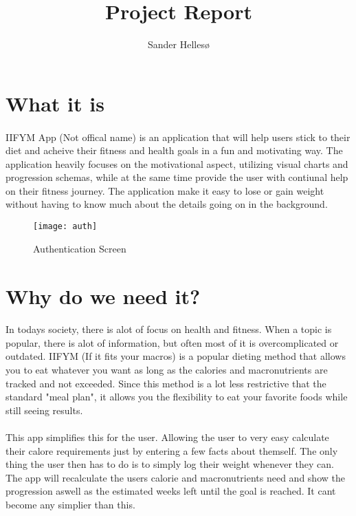 \documentclass{article}
\title{Project Report}
\author{Sander Hellesø}
\begin{document}

\setcounter{page}{1}

\tableofcontents
\newpage

\section{What it is}
\paragraph{}
    IIFYM App (Not offical name) is an application that will help users stick to their diet and acheive their fitness and health
    goals in a fun and motivating way. The application heavily focuses on the motivational aspect, utilizing visual charts and progression schemas, while
    at the same time provide the user with contiunal help on their fitness journey. The application make it easy to lose or gain weight without having to know
    much about the details going on in the background.

    \hfill \break
    \hfill \break
    \hfill \break

    \begin{figure}[h!]
        \texttt{[image: auth]}
        \centering
        \caption{Authentication Screen}
    \end{figure}


\newpage

\section{Why do we need it?}
\paragraph{}
    In todays society, there is alot of focus on health and fitness. When a topic is popular, there is alot of information, but often most of it is overcomplicated or outdated.
    IIFYM (If it fits your macros) is a popular dieting method that allows you to eat whatever you want as long as the calories and macronutrients are tracked and not exceeded.
    Since this method is a lot less restrictive that the standard "meal plan", it allows you the flexibility to eat your favorite foods while still seeing results.

\paragraph{}
    This app simplifies this for the user. Allowing the user to very easy calculate their calore requirements just by entering a few facts about themself. The only thing the
    user then has to do is to simply log their weight whenever they can. The app will recalculate the users calorie and macronutrients need and show the progression aswell
    as the estimated weeks left until the goal is reached. It cant become any simplier than this.
\end{document}
